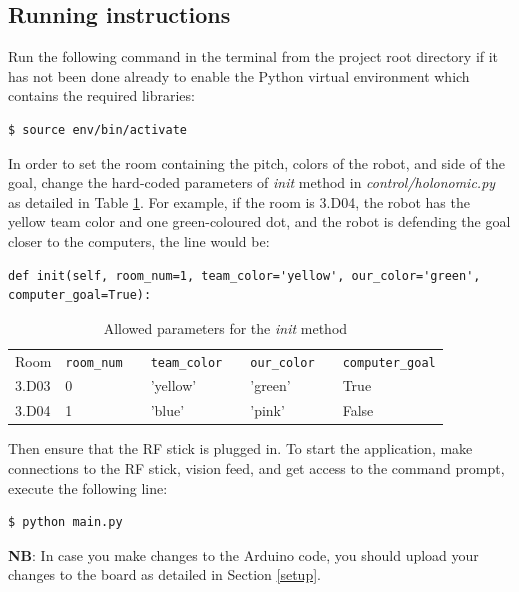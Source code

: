 \documentclass[a4paper,12pt]{article}
\begin{document}
\subsection{Running instructions}

Run the following command in the terminal from the project root directory if it has not been done already to enable the Python virtual environment which contains the required libraries:
\begin{lstlisting}
$ source env/bin/activate
\end{lstlisting}

In order to set the room containing the pitch, colors of the robot, and side of the goal, change the hard-coded parameters of \textit{init} method in \textit{control/holonomic.py} as detailed in Table \ref{tab:params}.
For example, if the room is 3.D04, the robot has the yellow team color and one green-coloured dot, and the robot is defending the goal closer to the computers, the line would be:
\begin{lstlisting}
def init(self, room_num=1, team_color='yellow', our_color='green', computer_goal=True):
\end{lstlisting}

\begin{table}[h!]
\centering
\begin{tabular}{ | l | l | l | l | l | l | l | l | }
    \cline{1-2} \cline{4-4} \cline{6-6} \cline{8-8}
    Room & \texttt{room\_num} & & \texttt{team\_color} & & \texttt{our\_color} & & \texttt{computer\_goal} \\ 
    \cline{1-2} \cline{4-4} \cline{6-6} \cline{8-8}
    3.D03 & 0 & & 'yellow' & & 'green' & & True \\ 
    \cline{1-2} \cline{4-4} \cline{6-6} \cline{8-8}
    3.D04 & 1 & & 'blue' & & 'pink' & & False \\ 
    \cline{1-2} \cline{4-4} \cline{6-6} \cline{8-8}
\end{tabular}
\caption{Allowed parameters for the \textit{init} method}
\label{tab:params}
\end{table}

Then ensure that the RF stick is plugged in. To start the application, make connections to the RF stick, vision feed, and get access to the command prompt, execute the following line:
\begin{lstlisting}
$ python main.py
\end{lstlisting}

\textbf{NB}: In case you make changes to the Arduino code, you should upload your changes to the board as detailed in Section \ref{setup}.
\end{document}
